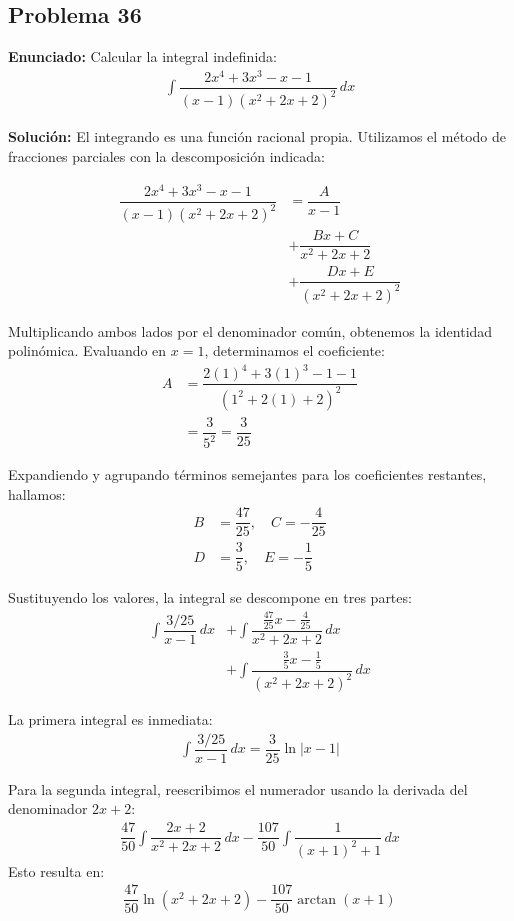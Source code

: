\subsection*{Problema 36}

\textbf{Enunciado:}
Calcular la integral indefinida:
\begin{align*}
\int \dfrac{2x^4 + 3x^3 - x - 1}{(x - 1)(x^2 + 2x + 2)^2} \, dx
\end{align*}

\textbf{Solución:}
El integrando es una función racional propia. 
Utilizamos el método de fracciones parciales 
con la descomposición indicada:

\begin{align*}
\dfrac{2x^4 + 3x^3 - x - 1}{(x - 1)(x^2 + 2x + 2)^2} &= 
\dfrac{A}{x - 1} \\
&+ \dfrac{Bx + C}{x^2 + 2x + 2} \\
&+ \dfrac{Dx + E}{(x^2 + 2x + 2)^2}
\end{align*}

Multiplicando ambos lados por el denominador 
común, obtenemos la identidad polinómica. 
Evaluando en $x = 1$, determinamos el coeficiente:
\begin{align*}
A &= \dfrac{2(1)^4 + 3(1)^3 - 1 - 1}{(1^2 + 2(1) + 2)^2} \\
&= \dfrac{3}{5^2} = \dfrac{3}{25}
\end{align*}

Expandiendo y agrupando términos semejantes para 
los coeficientes restantes, hallamos:
\begin{align*}
B &= \dfrac{47}{25}, \quad C = -\dfrac{4}{25} \\
D &= \dfrac{3}{5}, \quad E = -\dfrac{1}{5}
\end{align*}

Sustituyendo los valores, la integral se 
descompone en tres partes:
\begin{align*}
\int \dfrac{3/25}{x - 1} \, dx 
&+ \int \dfrac{\frac{47}{25}x - \frac{4}{25}}{x^2 + 2x + 2} \, dx \\
&+ \int \dfrac{\frac{3}{5}x - \frac{1}{5}}{(x^2 + 2x + 2)^2} \, dx
\end{align*}

La primera integral es inmediata:
\begin{align*}
\int \dfrac{3/25}{x - 1} \, dx = \dfrac{3}{25} \ln|x - 1|
\end{align*}

Para la segunda integral, reescribimos el 
numerador usando la derivada del denominador 
$2x + 2$:
\begin{align*}
\dfrac{47}{50} \int \dfrac{2x + 2}{x^2 + 2x + 2} \, dx 
- \dfrac{107}{50} \int \dfrac{1}{(x + 1)^2 + 1} \, dx
\end{align*}
Esto resulta en:
\begin{align*}
\dfrac{47}{50} \ln(x^2 + 2x + 2) - \dfrac{107}{50} \arctan(x + 1)
\end{align*}

